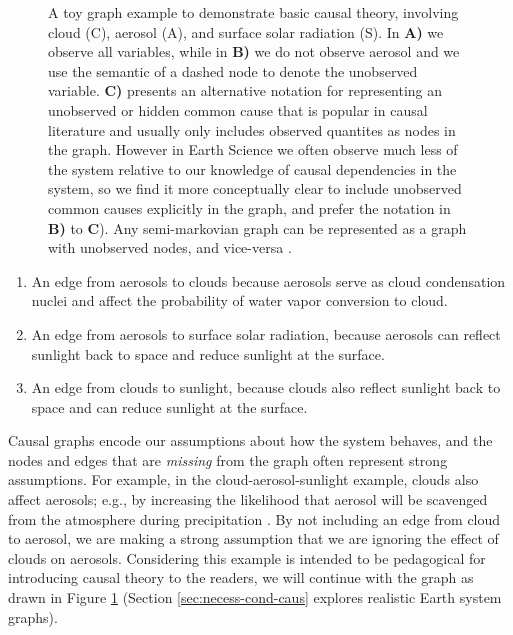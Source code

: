 \documentclass[12pt]{article}
\begin{document}
\begin{figure}
  \scalebox{1.0}{}
  \caption{A toy graph example to demonstrate basic causal theory,
    involving cloud (C), aerosol (A), and surface solar radiation
    (S). In \textbf{A)} we observe all variables, while in \textbf{B)}
    we do not observe aerosol and we use the semantic of a dashed node
    to denote the unobserved variable. \textbf{C)} presents an
    alternative notation for representing an unobserved or hidden
    common cause that is popular in causal literature \citep[e.g.,
    ``semi-markovian graphs'',][]{shpitser2006} and usually only
    includes observed quantites as nodes in the graph. However in
    Earth Science we often observe much less of the system relative to
    our knowledge of causal dependencies in the system, so we find it
    more conceptually clear to include unobserved common causes
    explicitly in the graph, and prefer the notation in \textbf{B)} to
    \textbf{C}). Any semi-markovian graph can be represented as a
    graph with unobserved nodes, and vice-versa
    \citep[e.g.,][]{lee2019structural}.}
  \label{fig:toy}
\end{figure}

\begin{enumerate}
\item An edge from aerosols to clouds because aerosols serve as cloud
  condensation nuclei and affect the probability of water vapor
  conversion to cloud.
\item An edge from aerosols to surface solar radiation, because
  aerosols can reflect sunlight back to space and reduce sunlight
  at the surface.
\item An edge from clouds to sunlight, because clouds also reflect
  sunlight back to space and can reduce sunlight at the surface.
\end{enumerate}

Causal graphs encode our assumptions about how the system behaves, and
the nodes and edges that are \textit{missing} from the graph often
represent strong assumptions. For example, in the
cloud-aerosol-sunlight example, clouds also affect aerosols; e.g., by
increasing the likelihood that aerosol will be scavenged from the
atmosphere during precipitation
\citep[e.g.,][]{radke-scavenge-1980}. By not including an edge from
cloud to aerosol, we are making a strong assumption that we are
ignoring the effect of clouds on aerosols. Considering this example is
intended to be pedagogical for introducing causal theory to the
readers, we will continue with the graph as drawn in Figure
\ref{fig:toy} (Section \ref{sec:necess-cond-caus} explores realistic
Earth system graphs).
\end{document}
